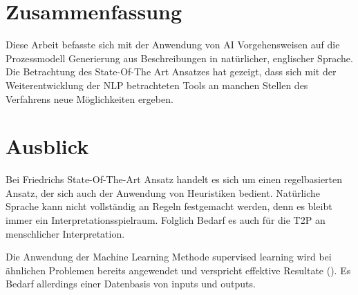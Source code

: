 \section{Zusammenfassung}
Diese Arbeit befasste sich mit der Anwendung von \ac{AI} Vorgehensweisen auf die Prozessmodell Generierung aus Beschreibungen in natürlicher, englischer Sprache. 
Die Betrachtung des State-Of-The Art Ansatzes hat gezeigt, dass sich mit der Weiterentwicklung der \ac{NLP} betrachteten Tools an manchen Stellen des Verfahrens neue Möglichkeiten ergeben.

\section{Ausblick}
Bei Friedrichs State-Of-The-Art Ansatz handelt es sich um einen regelbasierten Ansatz, der sich auch der Anwendung von Heuristiken bedient. Natürliche Sprache kann nicht vollständig an Regeln festgemacht werden, denn es bleibt immer ein Interpretationsspielraum. Folglich Bedarf es auch für die \ac{T2P} an menschlicher Interpretation. \par
Die Anwendung der Machine Learning Methode supervised learning wird bei ähnlichen Problemen bereits angewendet und verspricht effektive Resultate (\cite[vgl.][2]{BPMML}). Es Bedarf allerdings einer Datenbasis von inputs und outputs.